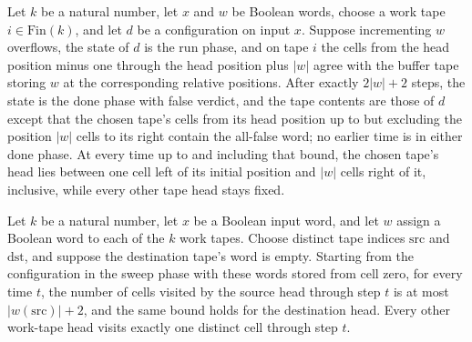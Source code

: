 \begin{theorem}
\label{Turing.incrementTM_run_overflow_ofCfg}
\leanok
{}
Let $k$ be a natural number, let $x$ and $w$ be Boolean words, choose a work tape
$i\in\mathrm{Fin}(k)$, and let $d$ be a configuration on input $x$. Suppose incrementing
$w$ overflows, the state of $d$ is the run phase, and on tape $i$ the cells from the
head position minus one through the head position plus $|w|$ agree with the buffer tape
storing $w$ at the corresponding relative positions. After exactly $2|w|+2$ steps, the
state is the done phase with false verdict, and the tape contents are those of $d$
except that the chosen tape's cells from its head position up to but excluding the
position $|w|$ cells to its right contain the all-false word; no earlier time is in
either done phase. At every time up to and including that bound, the chosen tape's head
lies between one cell left of its initial position and $|w|$ cells right of it,
inclusive, while every other tape head stays fixed.
\end{theorem}

\begin{theorem}
\label{Turing.transferTM_spaceUsedByTape}
\leanok
{}
Let $k$ be a natural number, let $x$ be a Boolean input word, and let $w$ assign a
Boolean word to each of the $k$ work tapes. Choose distinct tape indices $\mathrm{src}$
and $\mathrm{dst}$, and suppose the destination tape's word is empty. Starting from the
configuration in the sweep phase with these words stored from cell zero, for every time
$t$, the number of cells visited by the source head through step $t$ is at most
$|w(\mathrm{src})|+2$, and the same bound holds for the destination head. Every other
work-tape head visits exactly one distinct cell through step $t$.
\end{theorem}

